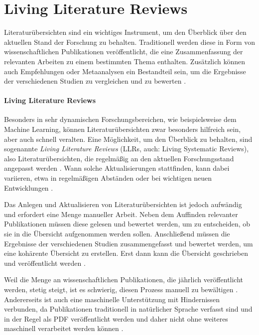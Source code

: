 \section{Living Literature Reviews}
\label{sec:living-literature-reviews}


Literaturübersichten sind ein wichtiges Instrument, um den Überblick über den aktuellen Stand der Forschung zu behalten.
Traditionell werden diese in Form von wissenschaftlichen Publikationen veröffentlicht, die eine Zusammenfassung der relevanten Arbeiten zu einem bestimmten Thema enthalten.
Zusätzlich können auch Empfehlungen oder Metaanalysen ein Bestandteil sein, um die Ergebnisse der verschiedenen Studien zu vergleichen und zu bewerten \cite{elliott2017living}.

\paragraph{Living Literature Reviews}

Besonders in sehr dynamischen Forschungsbereichen, wie beispielsweise dem Machine Learning, können  Literaturübersichten zwar besonders hilfreich sein, aber auch schnell veralten.
Eine Möglichkeit, um den Überblick zu behalten, sind sogenannte \textit{Living Literature Reviews} (LLRs, auch: Living Systematic Reviews), also Literaturübersichten, die regelmäßig an den aktuellen Forschungsstand angepasst werden \cite{living-lit-review}.
Wann solche Aktualisierungen stattfinden, kann dabei variieren, etwa in regelmäßigen Abständen oder bei wichtigen neuen Entwicklungen \cite{cochrane}.

Das Anlegen und Aktualisieren von Literaturübersichten ist jedoch aufwändig und erfordert eine Menge manueller Arbeit.
Neben dem Auffinden relevanter Publikationen müssen diese gelesen und bewertet werden, um zu entscheiden, ob sie in die Übersicht aufgenommen werden sollen.
Anschließend müssen die Ergebnisse der verschiedenen Studien zusammengefasst und bewertet werden, um eine kohärente Übersicht zu erstellen.
Erst dann kann die Übersicht geschrieben und veröffentlicht werden \cite{Brack2022}.


Weil die Menge an wissenschaftlichen Publikationen, die jährlich veröffentlicht werden, stetig steigt, ist es schwierig, diesen Prozess manuell zu bewältigen \cite{knowledge-extraction}.
Andererseits ist auch eine maschinelle Unterstützung mit Hindernissen verbunden, da Publikationen traditionell in natürlicher Sprache verfasst sind und in der Regel als PDF veröffentlicht werden und daher nicht ohne weiteres maschinell verarbeitet werden können \cite{Brack2022}.

